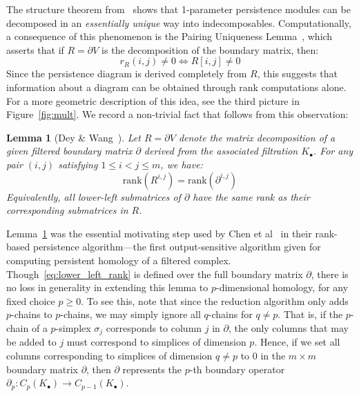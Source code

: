 \documentclass[10pt]{article}
\newcommand{\+}{%
	\raisebox{0.18ex}{\scaleobj{0.55}{+}}
}
\newtheorem{lemma}{Lemma}
\theoremstyle{definition}
\begin{document}
The structure theorem from~\cite{zomorodian2004computing} shows that 1-parameter persistence modules can be decomposed in an \emph{essentially unique} way into indecomposables. Computationally, a consequence of this phenomenon is the Pairing Uniqueness Lemma~\cite{cohen2006vines}, which asserts that if $R = \partial V$ is the decomposition of the boundary matrix, then:  
$$ r_R(i,j) \neq 0 \Leftrightarrow R[i,j] \neq 0 $$
Since the persistence diagram is derived completely from $R$, this suggests that information about a diagram can be obtained through rank computations alone.
For a more geometric description of this idea, see the third picture in Figure~\ref{fig:mult}. We record a non-trivial fact that follows from this observation: 
\begin{lemma}[Dey \& Wang~\cite{dey2022computational}]\label{lemma:rank}
Let $R = \partial V$ denote the matrix decomposition of a given filtered boundary matrix $\partial$ derived from the associated filtration $K_\bullet$. For any pair $(i,j)$ satisfying $1 \leq i < j \leq m$, we have:
	\begin{equation}\label{eq:lower_left_rank}
		\mathrm{rank}(R^{i,j}) = \mathrm{rank}(\partial^{i, j})
	\end{equation}
Equivalently, all lower-left submatrices of $\partial$ have the same rank as their corresponding submatrices in $R$. 
\end{lemma}
\noindent Lemma~\ref{lemma:rank} was the essential motivating step used by Chen et al~\cite{chen2011output} in their rank-based persistence algorithm---the first output-sensitive algorithm given for computing persistent homology of a filtered complex. %
Though~\eqref{eq:lower_left_rank} is defined over the full boundary matrix $\partial$, there is no loss in generality in extending this lemma to $p$-dimensional homology, for any fixed choice $p \geq 0$. To see this, note that since the reduction algorithm only adds $p$-chains to $p$-chains, we may simply ignore all $q$-chains for $q \neq p$. That is, if the $p$-chain of a $p$-simplex $\sigma_j$ corresponds to column $j$ in $\partial$, the only columns that may be added to $j$ must correspond to simplices of dimension $p$. Hence, if we set all columns corresponding to simplices of dimension $q \neq p$ to $0$ in the $m \times m$ boundary matrix $\partial$, then $\partial$ represents the $p$-th boundary operator $\partial_p : C_p(K_\bullet) \to C_{p-1}(K_\bullet)$. 
\end{document}
